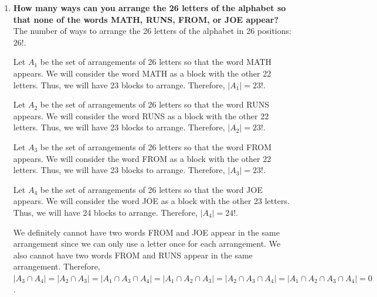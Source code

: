 \documentclass[10pt]{article}
\begin{document}
\begin{enumerate}
When we consider the intersection of four sets ($A_1 \cap A_2 \cap A_3 \cap A_4$), we end up having no choices to select since we exclude all the suits. Therefore, $|A_1 \cap A_2 \cap A_3 \cap A_4| = 0$.

According to the Inclusion-Exclusion Principle, we have: 

$|A_1 \cup A_2 \cup A_3 \cup A_4| = (|A_1| + |A_2| + |A_3| + |A_4|) - (|A_1 \cap A_2| + \ldots + |A_3 \cap A_4|) + (|A_1 \cap A_2 \cap A_3| + \ldots + |A_2 \cap A_3 \cap A_4|) - |A_1 \cap A_2 \cap A_3 \cap A_4| =\binom{4}{1}\times \binom{39}{6} - \binom{4}{2} \times \binom{26}{6} + \binom{4}{3} \times \binom{13}{6}$ 

Therefore, the number of ways to make a collection of 6 cards from a standard US 52-card deck so that the collection contains at least one card for each suit is $\binom{52}{6} - |A_1 \cup A_2 \cup A_3 \cup A_4| = \binom{52}{6} - (\binom{4}{1}\times \binom{39}{6} - \binom{4}{2} \times \binom{26}{6} + \binom{4}{3} \times \binom{13}{6}) = 8682544$.
 pt



\item
\textbf{How many ways can you arrange the 26 letters of the alphabet so that none of the words MATH, RUNS, FROM, or JOE appear?}\\

The number of ways to arrange the 26 letters of the alphabet in 26 positions: $26!$.

Let $A_1$ be the set of arrangements of 26 letters so that the word MATH appears. We will consider the word MATH as a block with the other 22 letters. Thus, we will have 23 blocks to arrange. Therefore, $|A_1| = 23!$.

Let $A_2$ be the set of arrangements of 26 letters so that the word RUNS appears. We will consider the word RUNS as a block with the other 22 letters. Thus, we will have 23 blocks to arrange. Therefore, $|A_2| = 23!$.

Let $A_3$ be the set of arrangements of 26 letters so that the word FROM appears. We will consider the word FROM as a block with the other 22 letters. Thus, we will have 23 blocks to arrange. Therefore, $|A_3| = 23!$.

Let $A_4$ be the set of arrangements of 26 letters so that the word JOE appears. We will consider the word JOE as a block with the other 23 letters. Thus, we will have 24 blocks to arrange. Therefore, $|A_4| = 24!$.

We definitely cannot have two words FROM and JOE appear in the same arrangement since we can only use a letter once for each arrangement. We also cannot have two words FROM and RUNS appear in the same arrangement. Therefore, $|A_3 \cap A_4| = |A_2 \cap A_3| = |A_1 \cap A_3 \cap A_4| = |A_1 \cap A_2 \cap A_3| = |A_2 \cap A_3 \cap A_4| = |A_1 \cap A_2 \cap A_3 \cap A_4| = 0$.


\end{enumerate}
\end{document}

